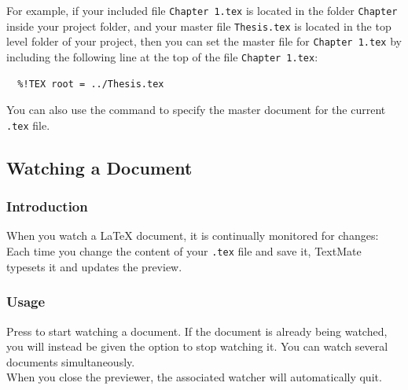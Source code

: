 \documentclass[11pt, x11names]{article}
\begin{document}
For example, if your included file \texttt{Chapter\ 1.tex} is located in the folder \texttt{Chapter} inside your project folder, and your master file \texttt{Thesis.tex} is located in the top level folder of your project, then you can set the master file for \texttt{Chapter\ 1.tex} by including the following line at the top of the file \texttt{Chapter\ 1.tex}:

\begin{verbatim}
  %!TEX root = ../Thesis.tex
\end{verbatim}

You can also use the command  to specify the master document for the current \texttt{.tex} file.

\subsection{Watching a Document}

\subsubsection{Introduction}

When you watch a LaTeX document, it is continually monitored for changes: Each time you change the content of your \texttt{.tex} file and save it, TextMate typesets it and updates the preview.

\subsubsection{Usage}

Press  to start watching a document. If the document is already being watched, you will instead be given the option to stop watching it. You can watch several documents simultaneously.\\

When you close the previewer, the associated watcher will automatically quit.
\end{document}
